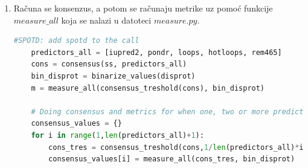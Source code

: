 \begin{enumerate}
\begin{lstlisting}[language=Python]
    def calculate(self):
        pass # Store result in self.calculated in form [aa1_prediction, aa2_prediction, aa3_prediction, ...]
\end{lstlisting}
Za prediktore kojima se pristupa preko njihovih veb stranica koristi se biblioteka $mechanize$ za popunjavanje odgovarajućih formi i biblioteka $re$ kojom se uvode regularni izrazi, neophodni za parsiranje dobijenih rezultata. Primer jednog od prediktora kod koga se predikcija vrši preko veb stranice:
\begin{lstlisting}[language=Python]
class pondr(Predictor):
    def calculate(self):
      global br
      url = "http://www.pondr.com/cgi-bin/pondr.cgi" 
      br.set_handle_robots(False)
      br.open(url)
      br.form = list(br.forms())[1] 
      br['ProteinName'] = "test"
      br['Sequence'] = self.sequence 
      response = br.submit()
      soup = BeautifulSoup(response.read(), features='html5lib')
      soup = soup.prettify()
      result = re.findall("VLXT\t\s.*", soup)
      # We don't need the first one because it is not sequence
      result = result[1:]
      predicted = []
      for r in result:
          pred = r[6:]
          predicted.append(pred)
      total = []
      # Getting everything in one sequence 
      for i in predicted:
        total += i
      old = len(total)
      
      pom = shortened_sequence(self.sequence)
      if(old < len(self.sequence)):
        for i in range(0,len(pom) - old):
          total.append(" ")
      total = [x if x != ' ' else '-' for x in total ]
      
      self.calculated = total
      return self.calculated
\end{lstlisting}
\item Računa se konsenzus, a potom se računaju metrike uz pomoć funkcije $measure\_all$ koja se nalazi u datoteci $measure.py$. 
\begin{lstlisting}[language=Python]
 #SPOTD: add spotd to the call
    predictors_all = [iupred2, pondr, loops, hotloops, rem465]
    cons = consensus(ss, predictors_all)
    bin_disprot = binarize_values(disprot)
    m = measure_all(consensus_treshold(cons), bin_disprot)

    # Doing consensus and metrics for when one, two or more predictors said "D"
    consensus_values = {}
    for i in range(1,len(predictors_all)+1):
        cons_tres = consensus_treshold(cons,1/len(predictors_all)*i)
        consensus_values[i] = measure_all(cons_tres, bin_disprot)      


\end{lstlisting}
\end{enumerate}
